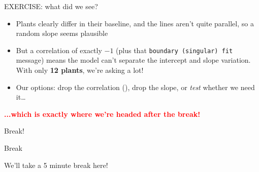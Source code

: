 \documentclass[
  ignorenonframetext,
  aspectratio=169,
]{beamer}
\providecommand{\tightlist}{%
  \setlength{\itemsep}{0pt}\setlength{\parskip}{0pt}}\usepackage{longtable,booktabs,array}
\begin{document}
\begin{frame}[fragile]{EXERCISE: what did we see?}
\label{exercise-what-did-we-see}
\begin{itemize}
\tightlist
\item
  Plants clearly differ in their baseline, and the lines aren't quite
  parallel, so a random slope seems plausible
\end{itemize}

\pause

\begin{itemize}
\tightlist
\item
  But a correlation of exactly \(-1\) (plus that
  \texttt{boundary\ (singular)\ fit} message) means the model can't
  separate the intercept and slope variation. With only \textbf{12
  plants}, we're asking a lot!
\end{itemize}

\pause

\begin{itemize}
\tightlist
\item
  Our options: drop the correlation (\texttt{\textbar{}\textbar{}}),
  drop the slope, or \emph{test} whether we need it\ldots{}
\end{itemize}

\pause

\begin{center}
\textbf{\textcolor{red}{...which is exactly where we're headed after the break!}}
\end{center}
\end{frame}

\begin{frame}{Break!}
\label{break}
\vspace{3em}

\begin{center}
\Huge Break

\vspace{1.5em}

\normalsize
We'll take a 5 minute break here! 
\end{center}
\end{frame}
\end{document}
